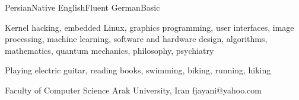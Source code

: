 \documentclass[a4paper,12pt]{memoir} %
\begin{document}

\SmallSep %


\Sep %




\CVLanguageSet
{Persian}{Native}
{English}{Fluent}
{German}{Basic}


\Sep %




{Kernel hacking, embedded Linux, graphics
programming, user interfaces, image processing,
machine learning, software and hardware design,
algorithms, mathematics, quantum mechanics,
philosophy, psychiatry}


{Playing electric guitar, reading books,
swimming, biking, running, hiking}


\Sep %




{Faculty of Computer Science}
{Arak University, Iran}
{fjayani@yahoo.com}

\end{document}
